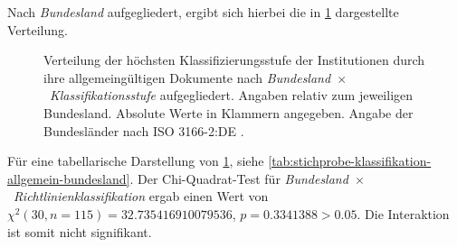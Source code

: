 Nach \textit{Bundesland} aufgegliedert, ergibt sich hierbei die in \cref{fig:policy-klassifikation-allgemein-absolut} dargestellte Verteilung.
\begin{figure}[!htbp]
    \centering
    \resizebox{\textwidth}{!}{}
    \caption{Verteilung der höchsten Klassifizierungsstufe der Institutionen durch ihre allgemeingültigen Dokumente nach \textit{Bundesland}~$\times$~\textit{Klassifikationsstufe} aufgegliedert.
    Angaben relativ zum jeweiligen Bundesland.
    Absolute Werte in Klammern angegeben.
    Angabe der Bundesländer nach ISO 3166-2:DE \autocite{ISO3166}.}
    \label{fig:policy-klassifikation-allgemein-absolut}
\end{figure}
Für eine tabellarische Darstellung von \cref{fig:policy-klassifikation-allgemein-absolut}, siehe \cref{tab:stichprobe-klassifikation-allgemein-bundesland}.
Der Chi-Quadrat-Test für \textit{Bundesland}~$\times$~\textit{Richtlinienklassifikation} ergab einen Wert von $\chi^2 (\num{30}, n=\num{115}) = \num[round-mode=places,round-precision=2]{32,735416910079536}$, $p = \num{0,3341388}>\num{0.05}$.
Die Interaktion ist somit nicht signifikant.

